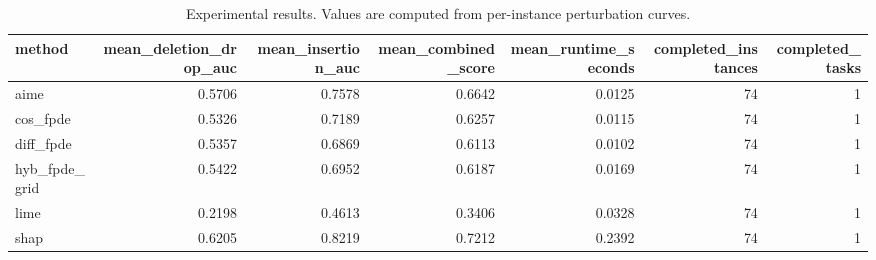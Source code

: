 \begin{table}[t]
\caption{Experimental results. Values are computed from per-instance perturbation curves.}
\label{tab:main_results_computed}
\centering
\begin{tabular}{lrrrrrr}
\toprule
method & mean\_deletion\_drop\_auc & mean\_insertion\_auc & mean\_combined\_score & mean\_runtime\_seconds & completed\_instances & completed\_tasks \\
\midrule
aime & 0.5706 & 0.7578 & 0.6642 & 0.0125 & 74 & 1 \\
cos\_fpde & 0.5326 & 0.7189 & 0.6257 & 0.0115 & 74 & 1 \\
diff\_fpde & 0.5357 & 0.6869 & 0.6113 & 0.0102 & 74 & 1 \\
hyb\_fpde\_grid & 0.5422 & 0.6952 & 0.6187 & 0.0169 & 74 & 1 \\
lime & 0.2198 & 0.4613 & 0.3406 & 0.0328 & 74 & 1 \\
shap & 0.6205 & 0.8219 & 0.7212 & 0.2392 & 74 & 1 \\
\bottomrule
\end{tabular}

\end{table}
